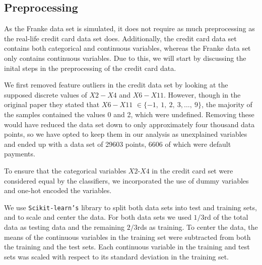 \documentclass[a4paper, 11pt, twocolumn]{article}
\begin{document}
\begin{table}[H]
	\caption{Table of the configurations for our generated data sets using
	Franke's function given in Equation (\ref{eq:Franke}) with added noise $\bm
	{\varepsilon} \sim N(0,\  \sigma^2) $. $n_x$ and $n_y$ indicate the number
	of points used to produce the grid in their respective directions.}
	\label{tab:franke_dataset}
\end{table}

\subsection{Preprocessing}
As the Franke data set is simulated, it does not require as much preprocessing as
the real-life credit card data set does. Additionally, the credit card data set
contains both categorical and continuous variables, whereas the Franke data set
only contains continuous variables. Due to this, we will start by discussing the
inital steps in the preprocessing of the credit card data.

We first removed feature outliers in the credit data set by looking at the supposed
discrete values of $X2-X4$ and $X6-X11$. However, though in the original paper
they stated that $X6-X11$ $\in\{-1,\ 1,\ 2,\ 3,\dots,\ 9\}$, the majority of
the samples contained the values 0 and 2, which were undefined. Removing these
would have reduced the data set down to only approximately four thousand data
points, so we have opted to keep them in our analysis as unexplained variables
and ended up with a data set of 29603 points, 6606 of which were default payments.

To ensure that the categorical variables $X2$-$X4$ in the credit card set were
considered equal by the classifiers, we incorporated the use of dummy variables
and one-hot encoded the variables.

We use \texttt{Scikit-learn's}\cite{sklearn_api} library to split both data sets
into test and training sets, and to scale and center the data.
For both data sets we used $1/3$rd of the total data as testing data
and the remaining $2/3$rds as training. To center the data, the means of the
continuous variables in the training set were subtracted from both the training
and the test sets. Each continuous variable in the training and test sets was
scaled with respect to its standard deviation in the training set.
\end{document}
